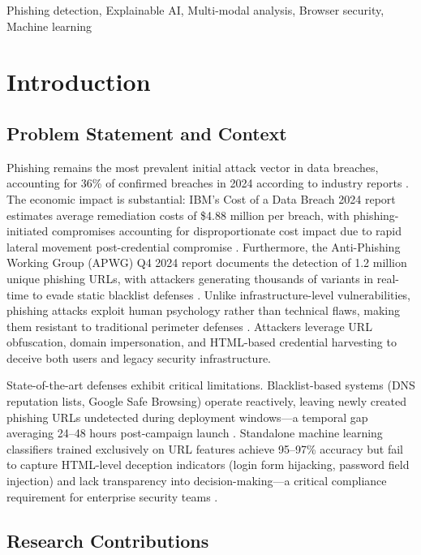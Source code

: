 \documentclass[conference]{IEEEtran}
\begin{document}
\begin{IEEEkeywords}
Phishing detection, Explainable AI, Multi-modal analysis, Browser security, Machine learning
\end{IEEEkeywords}

\section{Introduction}

\subsection{Problem Statement and Context}

Phishing remains the most prevalent initial attack vector in data breaches, accounting for 36\% of confirmed breaches in 2024 according to industry reports \cite{b1}. The economic impact is substantial: IBM's Cost of a Data Breach 2024 report estimates average remediation costs of \$4.88 million per breach, with phishing-initiated compromises accounting for disproportionate cost impact due to rapid lateral movement post-credential compromise \cite{b2}. Furthermore, the Anti-Phishing Working Group (APWG) Q4 2024 report documents the detection of 1.2 million unique phishing URLs, with attackers generating thousands of variants in real-time to evade static blacklist defenses \cite{b3}. Unlike infrastructure-level vulnerabilities, phishing attacks exploit human psychology rather than technical flaws, making them resistant to traditional perimeter defenses \cite{b4}. Attackers leverage URL obfuscation, domain impersonation, and HTML-based credential harvesting to deceive both users and legacy security infrastructure.

State-of-the-art defenses exhibit critical limitations. Blacklist-based systems (DNS reputation lists, Google Safe Browsing) operate reactively, leaving newly created phishing URLs undetected during deployment windows—a temporal gap averaging 24–48 hours post-campaign launch \cite{b5}. Standalone machine learning classifiers trained exclusively on URL features achieve 95–97\% accuracy but fail to capture HTML-level deception indicators (login form hijacking, password field injection) and lack transparency into decision-making—a critical compliance requirement for enterprise security teams \cite{b6}.

\subsection{Research Contributions}
\end{document}
